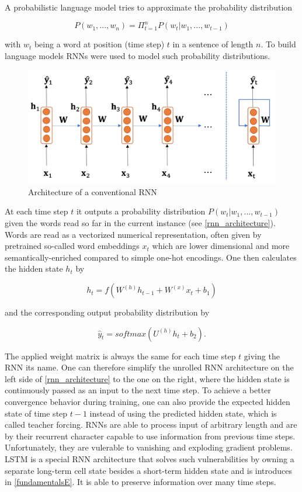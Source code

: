 A probabilistic language model tries to approximate the probability distribution 

\begin{equation}
	P(w_1, ..., w_n) = \Pi_{t=1}^{n} P(w_t | w_1, ..., w_{t-1})
\end{equation}

with $w_t$ being a word at position (time step) $t$ in a sentence of length $n$. To build language models \acp{RNN} were used to model such probability distributions. 

\begin{figure}[ht]
	\centering
	\includegraphics[width=0.8\linewidth]{figures/rnn_architecture.png}
	\caption{Architecture of a conventional \ac{RNN} \cite{Gertz2020}}
	\label{rnn_architecture}
\end{figure}

At each time step $t$ it outputs a probability distribution $P(w_t | w_1, ..., w_{t-1})$ given the words read so far in the current instance (see \autoref{rnn_architecture}). Words are read as a vectorized numerical representation, often given by pretrained so-called word embeddings $x_t$ which are lower dimensional and more semantically-enriched compared to simple one-hot encodings. One then calculates the hidden state $h_t$ by

\begin{equation}
	h_t = f(W^{(h)} h_{t-1} + W^{(x)} x_t + b_1)
\end{equation}

and the corresponding output probability distribution by 

\begin{equation}
	\hat{y}_t = softmax(U^{(h)} h_t + b_2).
\end{equation}

The applied weight matrix is always the same for each time step $t$ giving the \ac{RNN} its name. One can therefore simplify the unrolled \ac{RNN} architecture on the left side of \autoref{rnn_architecture} to the one on the right, where the hidden state is continuously passed as an input to the next time step. To achieve a better convergence behavior during training, one can also provide the expected hidden state of time step $t-1$ instead of using the predicted hidden state, which is called teacher forcing. \acp{RNN} are able to process input of arbitrary length and are by their recurrent character capable to use information from previous time steps. Unfortunately, they are vulerable to vanishing and exploding gradient problems. \ac{LSTM} is a special \ac{RNN} architecture that solves such vulnerabilities by owning a separate long-term cell state besides a short-term hidden state and is introduces in \autoref{fundamentalsE}. It is able to preserve information over many time steps. \cite{Gertz2020}

